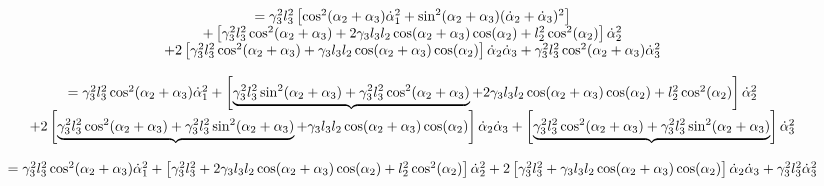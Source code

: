 \documentclass{article}
\begin{document}
\[\begin{array}{c}
=\gamma _{3}^{2}l_{3}^{2}\left[ \cos ^{2}(\alpha _{2}+\alpha _{3})\dot{\alpha%
}_{1}^{2}+\sin ^{2}(\alpha _{2}+\alpha _{3})(\dot{\alpha}_{2}+\dot{\alpha}%
_{3})^{2}\right]  \\ 
+\left[ \gamma _{3}^{2}l_{3}^{2}\cos ^{2}(\alpha _{2}+\alpha _{3})+2\gamma
_{3}l_{3}l_{2}\cos (\alpha _{2}+\alpha _{3})\cos (\alpha _{2})+l_{2}^{2}\cos
^{2}(\alpha _{2})\right] \dot{\alpha}_{2}^{2} \\ 
+2\left[ \gamma _{3}^{2}l_{3}^{2}\cos ^{2}(\alpha _{2}+\alpha _{3})+\gamma
_{3}l_{3}l_{2}\cos (\alpha _{2}+\alpha _{3})\cos (\alpha _{2})\right] \dot{%
\alpha}_{2}\dot{\alpha}_{3}+\gamma _{3}^{2}l_{3}^{2}\cos ^{2}(\alpha
_{2}+\alpha _{3})\dot{\alpha}_{3}^{2} \\ 
\\ 
=\gamma _{3}^{2}l_{3}^{2}\cos ^{2}(\alpha _{2}+\alpha _{3})\dot{\alpha}%
_{1}^{2}+\left[ \underbrace{\gamma _{3}^{2}l_{3}^{2}\sin ^{2}(\alpha
_{2}+\alpha _{3})+\gamma _{3}^{2}l_{3}^{2}\cos ^{2}(\alpha _{2}+\alpha _{3})}%
+2\gamma _{3}l_{3}l_{2}\cos (\alpha _{2}+\alpha _{3})\cos (\alpha
_{2})+l_{2}^{2}\cos ^{2}(\alpha _{2})\right] \dot{\alpha}_{2}^{2} \\ 
+2\left[ \underbrace{\gamma _{3}^{2}l_{3}^{2}\cos ^{2}(\alpha _{2}+\alpha
_{3})+\gamma _{3}^{2}l_{3}^{2}\sin ^{2}(\alpha _{2}+\alpha _{3})}+\gamma
_{3}l_{3}l_{2}\cos (\alpha _{2}+\alpha _{3})\cos (\alpha _{2})\right] \dot{%
\alpha}_{2}\dot{\alpha}_{3}+\left[ \underbrace{\gamma _{3}^{2}l_{3}^{2}\cos
^{2}(\alpha _{2}+\alpha _{3})+\gamma _{3}^{2}l_{3}^{2}\sin ^{2}(\alpha
_{2}+\alpha _{3})}\right] \dot{\alpha}_{3}^{2} \\ 
\\ 
=\gamma _{3}^{2}l_{3}^{2}\cos ^{2}(\alpha _{2}+\alpha _{3})\dot{\alpha}%
_{1}^{2}+\left[ \gamma _{3}^{2}l_{3}^{2}+2\gamma _{3}l_{3}l_{2}\cos (\alpha
_{2}+\alpha _{3})\cos (\alpha _{2})+l_{2}^{2}\cos ^{2}(\alpha _{2})\right] 
\dot{\alpha}_{2}^{2}+2\left[ \gamma _{3}^{2}l_{3}^{2}+\gamma
_{3}l_{3}l_{2}\cos (\alpha _{2}+\alpha _{3})\cos (\alpha _{2})\right] \dot{%
\alpha}_{2}\dot{\alpha}_{3}+\gamma _{3}^{2}l_{3}^{2}\dot{\alpha}_{3}^{2}%
\end{array}%
\]
\end{document}

